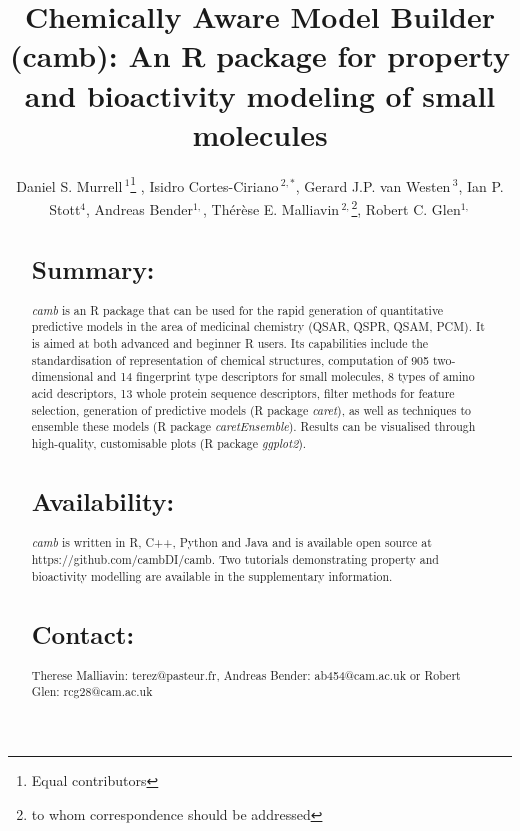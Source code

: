 \documentclass{bioinfo}
\begin{document}

\title{Chemically Aware Model Builder (camb): An R package for property and bioactivity modeling of small molecules}
\author[Murrell \& Cortes-Ciriano \it{et~al}]{Daniel S. Murrell\,$^{1}$\footnote{Equal contributors} , Isidro Cortes-Ciriano\,$^{2,*}$, Gerard J.P. van Westen\,$^{3}$, Ian P. Stott$^{4}$, Andreas Bender$^{1,}$\dag, Th\'er\`ese E. Malliavin\,$^{2,}$\footnote{to whom correspondence should be addressed},  Robert C. Glen$^{1,}$\dag}
\address{$^{1}$Unilever Centre for Molecular Science Informatics, Department of Chemistry, University of Cambridge, Lensfield Road, Cambridge CB2 1EW, United Kingdom.\\
$^{2}$Unite de Bioinformatique Structurale, Institut Pasteur and CNRS UMR 3825, Structural Biology and Chemistry Department, 25, rue Dr. Roux, 75 724 Paris, France.\\
$^{3}$European Molecular Biology Laboratory European Bioinformatics Institute Wellcome Trust Genome Campus, Hinxton, United Kingdom.\\
$^{4}$Unilever Research, Bebington, UK}


\maketitle

\begin{abstract}
\section{Summary:}
{\it camb} is an R package that can be used for the rapid generation of quantitative predictive models in the area of medicinal chemistry (QSAR, QSPR, QSAM, PCM). It is aimed at both advanced and beginner R users.
Its capabilities include the standardisation of representation of chemical structures, computation of 905 two-dimensional and 14 fingerprint type descriptors for small molecules, 8 types of amino acid descriptors, 13 whole protein sequence descriptors, filter methods for feature selection, generation of predictive models (R package {\it caret}), as well as techniques to ensemble these models (R package {\it caretEnsemble}).
Results can be visualised through high-quality, customisable plots (R package {\it ggplot2}).
\section{Availability:} {\it camb} is written in R, C++, Python and Java and is available open source
at https://github.com/cambDI/camb.
Two tutorials demonstrating property and bioactivity modelling are available in the supplementary information.\\
\section{Contact:} Therese Malliavin: terez@pasteur.fr, Andreas Bender: ab454@cam.ac.uk or Robert Glen: rcg28@cam.ac.uk
\end{abstract}
\end{document}
